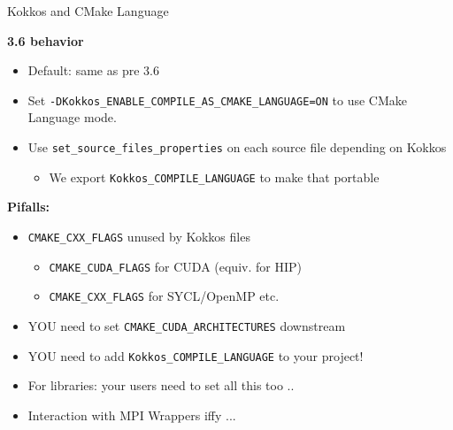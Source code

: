 \begin{frame}[fragile]{Kokkos and CMake Language}

  \textbf{3.6 behavior}

  
  \begin{itemize}
    \item {Default: same as pre 3.6}
    \item {Set \texttt{-DKokkos\_ENABLE\_COMPILE\_AS\_CMAKE\_LANGUAGE=ON} to use CMake Language mode.}
    \item {Use \texttt{set\_source\_files\_properties} on each source file depending on Kokkos}
    \begin{itemize}
      \item{We export \texttt{Kokkos\_COMPILE\_LANGUAGE} to make that portable}
    \end{itemize}
  \end{itemize}

  \textbf{Pifalls:}
  \begin{itemize}
    \item {\texttt{CMAKE\_CXX\_FLAGS} unused by Kokkos files}
    \begin{itemize} 
      \item{\texttt{CMAKE\_CUDA\_FLAGS} for CUDA (equiv. for HIP)}
      \item{\texttt{CMAKE\_CXX\_FLAGS} for SYCL/OpenMP etc.}
    \end{itemize}
    \item{YOU need to set \texttt{CMAKE\_CUDA\_ARCHITECTURES} downstream}
    \item{YOU need to add \texttt{Kokkos\_COMPILE\_LANGUAGE} to your project!}
    \item{For libraries: your users need to set all this too ..}
    \item{Interaction with MPI Wrappers iffy ...}
  \end{itemize}


\end{frame}

